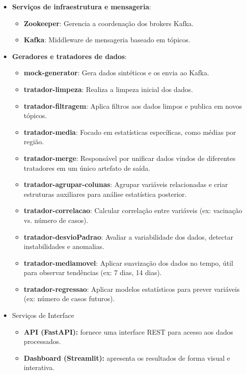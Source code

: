 \documentclass[a4paper,12pt]{article}
\begin{document}
\begin{itemize}
  \item \textbf{Serviços de infraestrutura e mensageria}: 
          \begin{itemize}
          \item \textbf{Zookeeper}: Gerencia a coordenação dos brokers Kafka.
          \item \textbf{Kafka}: Middleware de mensageria baseado em tópicos.
          \end{itemize}
  \item \textbf{Geradores e tratadores de dados}:
  \begin{itemize}
  \item \textbf{mock-generator}: Gera dados sintéticos e os envia ao Kafka.
  \item \textbf{tratador-limpeza}: Realiza a limpeza inicial dos dados.
  \item \textbf{tratador-filtragem}: Aplica filtros aos dados limpos e publica em novos tópicos.
  \item \textbf{tratador-media}: Focado em estatísticas específicas, como médias por região.
  \item \textbf{tratador-merge}: Responsável por unificar dados vindos de diferentes tratadores em um único artefato de saída.
    \item \textbf{tratador-agrupar-colunas}: Agrupar variáveis relacionadas e criar estruturas auxiliares para análise estatística posterior.
    \item \textbf{tratador-correlacao}: Calcular correlação entre variáveis (ex: vacinação vs. número de casos).
    \item \textbf{tratador-desvioPadrao}: Avaliar a variabilidade dos dados, detectar instabilidades e anomalias.
    \item \textbf{tratador-mediamovel}: Aplicar suavização dos dados no tempo, útil para observar tendências (ex: 7 dias, 14 dias).
    \item \textbf{tratador-regressao}: Aplicar modelos estatísticos para prever variáveis (ex: número de casos futuros).
\end{itemize}
    \item Serviços de Interface 

    \begin{itemize}
  \item \textbf{API (FastAPI):} fornece uma interface REST para acesso aos dados processados.
  \item \textbf{Dashboard (Streamlit):} apresenta os resultados de forma visual e interativa.
\end{itemize}
\end{itemize}
\end{document}
